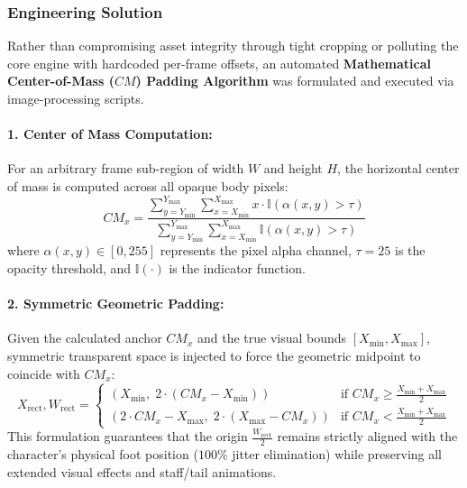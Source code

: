 \subsubsection{Engineering Solution}
Rather than compromising asset integrity through tight cropping or polluting the core engine with hardcoded per-frame offsets, an automated \textbf{Mathematical Center-of-Mass ($CM$) Padding Algorithm} was formulated and executed via image-processing scripts.

\paragraph{1. Center of Mass Computation:} For an arbitrary frame sub-region of width $W$ and height $H$, the horizontal center of mass is computed across all opaque body pixels:
\begin{equation}
    CM_x = \frac{\sum_{y=Y_{\min}}^{Y_{\max}} \sum_{x=X_{\min}}^{X_{\max}} x \cdot \mathbb{I}(\alpha(x, y) > \tau)}{\sum_{y=Y_{\min}}^{Y_{\max}} \sum_{x=X_{\min}}^{X_{\max}} \mathbb{I}(\alpha(x, y) > \tau)}
\end{equation}
where $\alpha(x, y) \in [0, 255]$ represents the pixel alpha channel, $\tau = 25$ is the opacity threshold, and $\mathbb{I}(\cdot)$ is the indicator function.

\paragraph{2. Symmetric Geometric Padding:} Given the calculated anchor $CM_x$ and the true visual bounds $[X_{\min}, X_{\max}]$, symmetric transparent space is injected to force the geometric midpoint to coincide with $CM_x$:
\begin{equation}
    X_{\text{rect}}, W_{\text{rect}} = 
    \begin{cases} 
        \left( X_{\min}, \; 2 \cdot (CM_x - X_{\min}) \right) & \text{if } CM_x \ge \frac{X_{\min} + X_{\max}}{2} \\
        \left( 2 \cdot CM_x - X_{\max}, \; 2 \cdot (X_{\max} - CM_x) \right) & \text{if } CM_x < \frac{X_{\min} + X_{\max}}{2}
    \end{cases}
\end{equation}
This formulation guarantees that the origin $\frac{W_{\text{rect}}}{2}$ remains strictly aligned with the character's physical foot position ($100\%$ jitter elimination) while preserving all extended visual effects and staff/tail animations.

